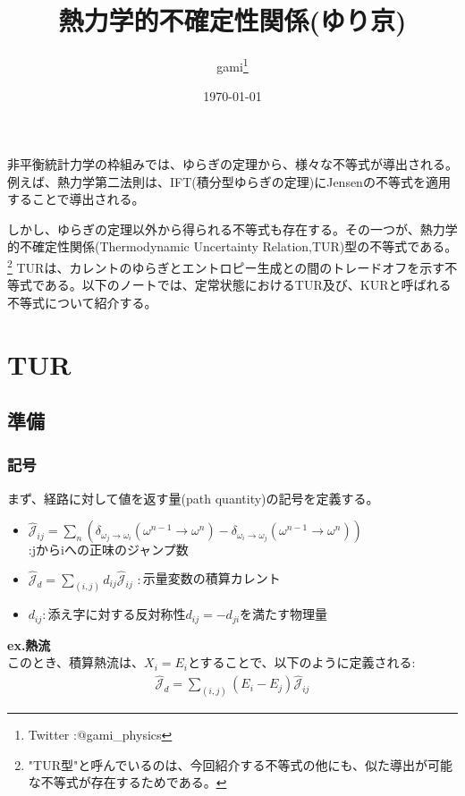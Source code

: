 \documentclass[a4paper,11pt]{jsarticle}
\numberwithin{equation}{section}
\begin{document}
\title{熱力学的不確定性関係(ゆり京)}
\author{gami\footnote{Twitter :@gami\_physics}}
\date{\today}
\maketitle

非平衡統計力学の枠組みでは、ゆらぎの定理から、様々な不等式が導出される。例えば、熱力学第二法則は、IFT(積分型ゆらぎの定理)にJensenの不等式を適用することで導出される。

しかし、ゆらぎの定理以外から得られる不等式も存在する。その一つが、熱力学的不確定性関係(Thermodynamic Uncertainty Relation,TUR)型の不等式である。
\footnote{"TUR型"と呼んでいるのは、今回紹介する不等式の他にも、似た導出が可能な不等式が存在するためである。}
TURは、カレントのゆらぎとエントロピー生成との間のトレードオフを示す不等式である。以下のノートでは、定常状態におけるTUR及び、KURと呼ばれる不等式について紹介する。



\section{TUR}
\subsection{準備}
\subsubsection{記号}
まず、経路に対して値を返す量(path quantity)の記号を定義する。
\begin{itemize}
    \item $\hat{\mathcal{J}}_{ij} = \sum_{n} (\delta_{\omega_j \to \omega_i}(\omega^{n-1}\to \omega^n) - \delta_{\omega_i \to \omega_j}(\omega^{n-1}\to \omega^n))$
$: \text{jからiへの正味のジャンプ数}$\\
    \item $\hat{\mathcal{J}}_{d} = \sum_{(i,j)} d_{ij} \hat{\mathcal{J}}_{ij}$
$:$示量変数の積算カレント
    \item $d_{ij}:$添え字に対する反対称性$d_{ij} = -d_{ji}$を満たす物理量
\end{itemize}

\textbf{ex.熱流}\\
このとき、積算熱流は、$X_i = E_i$とすることで、以下のように定義される:
\begin{align}
    \hat{\mathcal{J}}_{d} = \sum_{(i,j)} (E_i - E_j) \hat{\mathcal{J}}_{ij}
\end{align}
\end{document}
